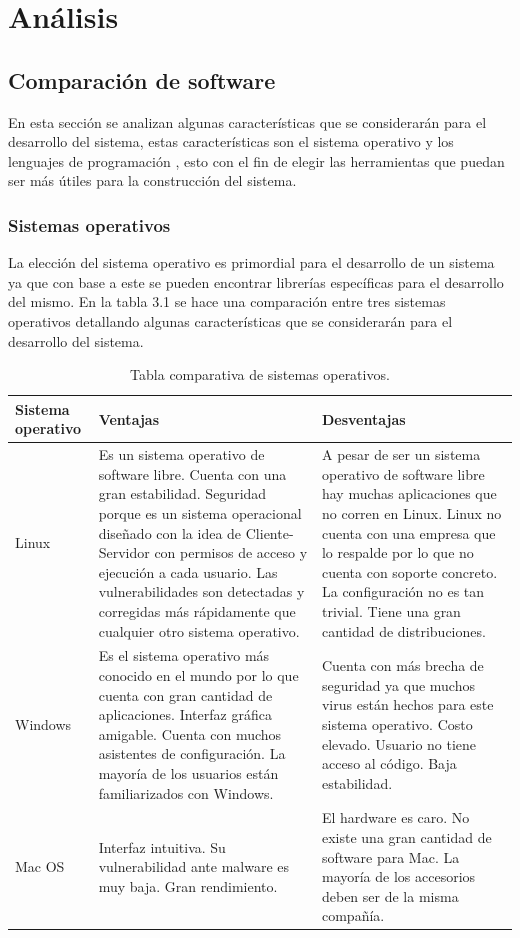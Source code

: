 \documentclass[12pt]{report}
\begin{document}
\chapter{Análisis}
\section{Comparación de software}
En esta sección se analizan algunas características que se considerarán para el desarrollo del sistema, estas características son el sistema operativo y los lenguajes de programación , esto con el fin de elegir las herramientas que puedan ser más útiles para la construcción del sistema.

\subsection{Sistemas operativos}
La elección del sistema operativo es primordial para el desarrollo de un sistema ya que con base a este se pueden encontrar librerías específicas para el desarrollo del mismo. En la tabla 3.1  se hace una comparación entre tres sistemas operativos detallando algunas características que se considerarán para el desarrollo del sistema.

\begin{table}[H]
\begin{center}
\begin{tabular}{|p{25mm}|p{60mm}|p{60mm}|}
\hline
Sistema operativo & Ventajas & Desventajas\\
\hline \hline 
Linux & Es un sistema operativo de software libre. Cuenta con una gran estabilidad. Seguridad porque es un sistema operacional diseñado con la idea de Cliente-Servidor con permisos de acceso y ejecución a cada usuario. Las vulnerabilidades son detectadas y corregidas más rápidamente que cualquier otro sistema operativo.\cite{so} & A pesar de ser un sistema operativo de software libre hay muchas aplicaciones que no corren en Linux. Linux no cuenta con una empresa que lo respalde por lo que no cuenta con soporte concreto. La configuración no es tan trivial.  Tiene una gran cantidad de distribuciones.\cite{so}\\
\hline
Windows & Es el sistema operativo más conocido en el mundo por lo que cuenta con gran cantidad de aplicaciones. Interfaz gráfica amigable. Cuenta con muchos asistentes de configuración. La mayoría de los usuarios están familiarizados con Windows.\cite{so} & Cuenta con más brecha de seguridad ya que muchos virus están hechos para este sistema operativo. Costo elevado. Usuario no tiene acceso al código. Baja estabilidad.\cite{so}\\
\hline
Mac OS & Interfaz intuitiva. Su vulnerabilidad ante malware es muy baja.  Gran rendimiento.\cite{mac} & El hardware es caro. No existe una gran cantidad de software para Mac. La mayoría de los accesorios deben ser de la misma compañía.\cite{mac}\\
\hline
\end{tabular}
\caption{Tabla comparativa de sistemas operativos.}
\end{center}
\end{table}
\end{document}
